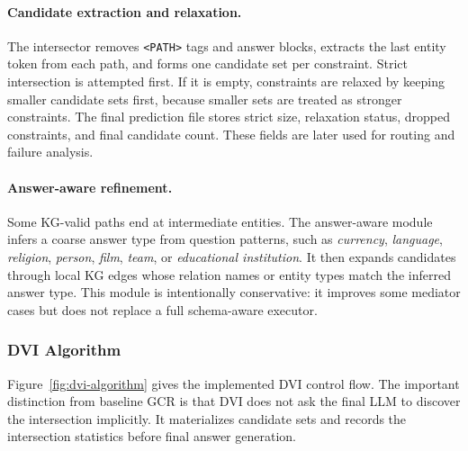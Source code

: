\documentclass[10pt,twocolumn]{article}
\newcommand{\code}[1]{\texttt{#1}}
\begin{document}
\paragraph{Candidate extraction and relaxation.}
The intersector removes \code{<PATH>} tags and answer blocks, extracts the last entity token from each path, and forms one candidate set per constraint. Strict intersection is attempted first. If it is empty, constraints are relaxed by keeping smaller candidate sets first, because smaller sets are treated as stronger constraints. The final prediction file stores strict size, relaxation status, dropped constraints, and final candidate count. These fields are later used for routing and failure analysis.

\paragraph{Answer-aware refinement.}
Some KG-valid paths end at intermediate entities. The answer-aware module infers a coarse answer type from question patterns, such as \emph{currency}, \emph{language}, \emph{religion}, \emph{person}, \emph{film}, \emph{team}, or \emph{educational institution}. It then expands candidates through local KG edges whose relation names or entity types match the inferred answer type. This module is intentionally conservative: it improves some mediator cases but does not replace a full schema-aware executor.


\subsubsection{DVI Algorithm}
Figure~\ref{fig:dvi-algorithm} gives the implemented DVI control flow. The important distinction from baseline GCR is that DVI does not ask the final LLM to discover the intersection implicitly. It materializes candidate sets and records the intersection statistics before final answer generation.
\end{document}

